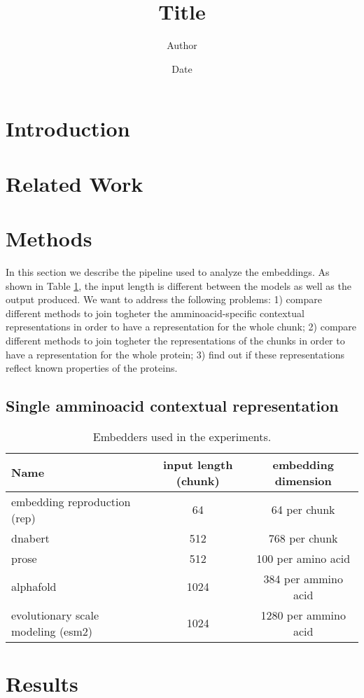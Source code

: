 \documentclass[12pt, letterpaper, twocolumn]{article}
\title{Title}
\author{Author}
\date{Date}
\begin{document}
\maketitle

\section{Introduction}

\section{Related Work}

\section{Methods}

In this section we describe the pipeline used to analyze the embeddings. As shown in Table \ref{table:data}, the input length is different between the models as well as the output produced. We want to address the following problems: 1) compare different methods to join togheter the amminoacid-specific contextual representations in order to have a representation for the whole chunk; 2) compare different methods to join togheter the representations of the chunks in order to have a representation for the whole protein; 3) find out if these representations reflect known properties of the proteins.

\subsection{Single amminoacid contextual representation}




\onecolumn
\begin{table}[h]
\centering
\begin{tabular}{|l c c|} 
    \hline
    Name & input length (chunk) & embedding dimension  \\ 
    \hline
    embedding reproduction (rep)\cite{yang2018learned}       & 64    & 64 per chunk   \\
    dnabert \cite{ji2021dnabert}                     & 512     & 768 per chunk \\
    prose   \cite{bepler2021learning}                   & 512   & 100 per amino acid   \\
    alphafold  \cite{jumper2021highly}                 & 1024   & 384 per ammino acid\\
    evolutionary scale modeling (esm2) \cite{lin2022language}   & 1024    & 1280 per ammino acid \\  
    \hline
\end{tabular}
\caption{Embedders used in the experiments.}
\label{table:data}
\end{table}
\twocolumn

\section{Results}

\onecolumn
\newpage
\FloatBarrier


\end{document}
